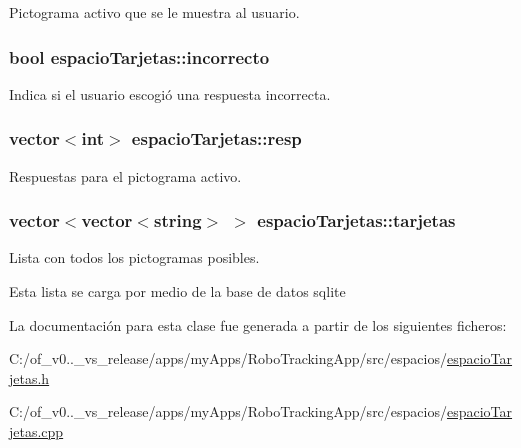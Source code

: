 Pictograma activo que se le muestra al usuario. 

\hypertarget{classespacio_tarjetas_aec7ea4a5a0e9f386d8d256f2444ebfaf}{}
\subsubsection[{incorrecto}]{\setlength{\rightskip}{0pt plus 5cm}bool espacio\+Tarjetas\+::incorrecto\hspace{0.3cm}{\ttfamily [private]}}\label{classespacio_tarjetas_aec7ea4a5a0e9f386d8d256f2444ebfaf}


Indica si el usuario escogió una respuesta incorrecta. 

\hypertarget{classespacio_tarjetas_a3f296834b82b6e44ebc15999d949b547}{}
\subsubsection[{resp}]{\setlength{\rightskip}{0pt plus 5cm}vector$<$int$>$ espacio\+Tarjetas\+::resp\hspace{0.3cm}{\ttfamily [private]}}\label{classespacio_tarjetas_a3f296834b82b6e44ebc15999d949b547}


Respuestas para el pictograma activo. 

\hypertarget{classespacio_tarjetas_a4f544a79ef84de1cd86c659fad6c762c}{}
\subsubsection[{tarjetas}]{\setlength{\rightskip}{0pt plus 5cm}vector$<$vector$<$string$>$ $>$ espacio\+Tarjetas\+::tarjetas\hspace{0.3cm}{\ttfamily [private]}}\label{classespacio_tarjetas_a4f544a79ef84de1cd86c659fad6c762c}


Lista con todos los pictogramas posibles. 

Esta lista se carga por medio de la base de datos sqlite 

La documentación para esta clase fue generada a partir de los siguientes ficheros\+:\begin{DoxyCompactItemize}
\item 
C\+:/of\+\_\+v0..\+\_\+vs\+\_\+release/apps/my\+Apps/\+Robo\+Tracking\+App/src/espacios/\hyperlink{espacio_tarjetas_8h}{espacio\+Tarjetas.\+h}\item 
C\+:/of\+\_\+v0..\+\_\+vs\+\_\+release/apps/my\+Apps/\+Robo\+Tracking\+App/src/espacios/\hyperlink{espacio_tarjetas_8cpp}{espacio\+Tarjetas.\+cpp}\end{DoxyCompactItemize}
